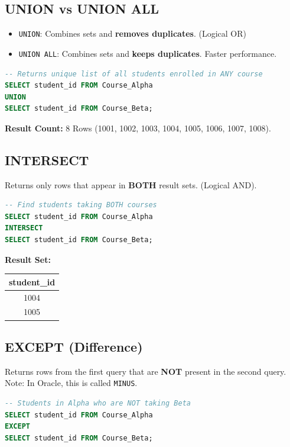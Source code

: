 \documentclass[12pt,a4paper]{article}
\begin{document}
\subsection{UNION vs UNION ALL}
\begin{itemize}
    \item \texttt{UNION}: Combines sets and \textbf{removes duplicates}. (Logical OR)
    \item \texttt{UNION ALL}: Combines sets and \textbf{keeps duplicates}. Faster performance.
\end{itemize}

\begin{lstlisting}[language=SQL]
-- Returns unique list of all students enrolled in ANY course
SELECT student_id FROM Course_Alpha
UNION
SELECT student_id FROM Course_Beta;
\end{lstlisting}
\textbf{Result Count:} 8 Rows (1001, 1002, 1003, 1004, 1005, 1006, 1007, 1008).

\subsection{INTERSECT}
Returns only rows that appear in \textbf{BOTH} result sets. (Logical AND).

\begin{lstlisting}[language=SQL]
-- Find students taking BOTH courses
SELECT student_id FROM Course_Alpha
INTERSECT
SELECT student_id FROM Course_Beta;
\end{lstlisting}

\textbf{Result Set:}
\begin{table}[H]
\centering
\begin{tabular}{@{}c@{}}
\toprule
\textbf{student\_id} \\ \midrule
1004 \\
1005 \\ \bottomrule
\end{tabular}
\end{table}

\subsection{EXCEPT (Difference)}
Returns rows from the first query that are \textbf{NOT} present in the second query. Note: In Oracle, this is called \texttt{MINUS}.

\begin{lstlisting}[language=SQL]
-- Students in Alpha who are NOT taking Beta
SELECT student_id FROM Course_Alpha
EXCEPT
SELECT student_id FROM Course_Beta;
\end{lstlisting}
\end{document}
